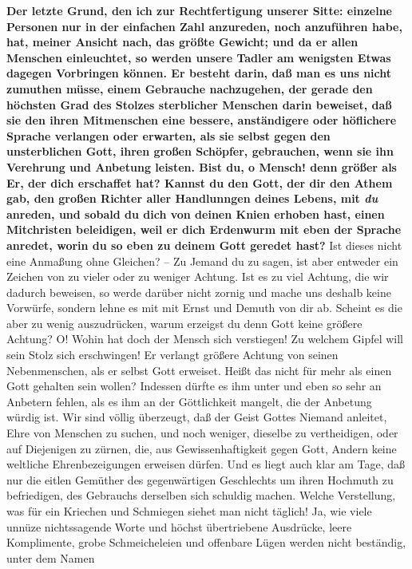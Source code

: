 \textbf{Der letzte Grund, den ich zur Rechtfertigung unserer Sitte: einzelne Personen
nur in der einfachen Zahl anzureden, noch anzuführen habe, hat, meiner Ansicht
nach, das größte Gewicht; und da er allen Menschen einleuchtet, so werden unsere
Tadler am wenigsten Etwas dagegen Vorbringen können. Er besteht darin, daß man
es uns nicht zumuthen müsse, einem Gebrauche nachzugehen, der gerade den
höchsten Grad des Stolzes sterblicher Menschen darin beweiset, daß sie den ihren
Mitmenschen eine bessere, anständigere oder höflichere Sprache verlangen oder
erwarten, als sie selbst gegen den unsterblichen Gott, ihren großen Schöpfer,
gebrauchen, wenn sie ihn Verehrung und Anbetung leisten.  Bist du, o Mensch! denn
größer als Er, der dich erschaffet hat? Kannst du den Gott, der dir den Athem
gab, den großen Richter aller Handlunngen deines Lebens, mit \textit{du} anreden, und
sobald du dich von deinen Knien erhoben hast, einen Mitchristen beleidigen, weil
er dich Erdenwurm mit eben der Sprache anredet, worin du so eben zu deinem Gott
geredet hast?} Ist dieses nicht eine Anmaßung ohne Gleichen? -- Zu Jemand du zu
sagen, ist aber entweder ein Zeichen von zu vieler oder zu weniger Achtung. Ist
es zu viel Achtung, die wir dadurch beweisen, so werde darüber nicht zornig und
mache uns deshalb keine Vorwürfe, sondern lehne es mit mit Ernst und Demuth von
dir ab. Scheint es die aber zu wenig auszudrücken, warum erzeigst du denn Gott
keine größere Achtung? O! Wohin hat doch der Mensch sich verstiegen! Zu welchem
Gipfel will sein Stolz sich erschwingen! Er verlangt größere Achtung von seinen
Nebenmenschen, als er selbst Gott erweiset. Heißt das nicht für mehr als einen
Gott gehalten sein wollen? Indessen dürfte es ihm unter und eben so sehr an
Anbetern fehlen, als es ihm an der Göttlichkeit mangelt, die der Anbetung würdig
ist. Wir sind völlig überzeugt, daß der Geist Gottes Niemand anleitet, Ehre von
Menschen zu suchen, und noch weniger, dieselbe zu vertheidigen, oder auf
Diejenigen zu zürnen, die, aus Gewissenhaftigkeit gegen Gott, Andern keine
weltliche Ehrenbezeigungen erweisen dürfen. Und es liegt auch klar am Tage, daß
nur die eitlen Gemüther des gegenwärtigen Geschlechts um ihren Hochmuth zu
befriedigen, des Gebrauchs derselben sich schuldig machen. Welche Verstellung,
was für ein Kriechen und Schmiegen siehet man nicht täglich! Ja, wie viele
unnüze nichtssagende Worte und höchst übertriebene Ausdrücke, leere Komplimente,
grobe Schmeicheleien und offenbare Lügen werden nicht beständig, unter dem Namen
